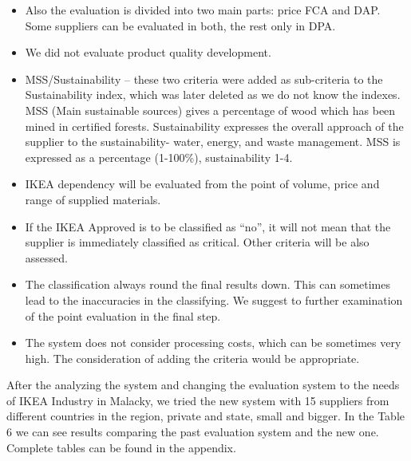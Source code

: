 \documentclass[oneside,12pt]{article}%
\begin{document}
\begin{itemize}
    \item Also the evaluation is divided into two main parts: price FCA and DAP. Some suppliers can be evaluated in both, the rest only in DPA.
    \item We did not evaluate product quality development.
    \item MSS/Sustainability – these two criteria were added as sub-criteria to the Sustainability index, which was later deleted as we do not know the indexes. MSS (Main sustainable sources) gives a percentage of wood which has been mined in certified forests. Sustainability expresses the overall approach of the supplier to the sustainability- water, energy, and waste management. MSS is expressed as a percentage (1-100\%), sustainability 1-4.
  \item IKEA dependency will be evaluated from the point of volume, price and range of supplied materials.
  \item If the IKEA Approved is to be classified as ``no'', it will not mean that the supplier is immediately classified as critical. Other criteria will be also assessed.
  \item The classification always round the final results down. This can sometimes lead to the inaccuracies in the classifying. We suggest to further examination of the point evaluation in the final step.
  \item The system does not consider processing costs, which can be sometimes very high. The consideration of adding the criteria would be appropriate.

\end{itemize}


After the analyzing the system and changing the evaluation system to the needs of IKEA Industry in Malacky, we tried the new system with 15 suppliers from different countries in the region, private and state, small and bigger. In the Table 6 we can see results comparing the past evaluation system and the new one. Complete tables can be found in the appendix. \par
\end{document}
